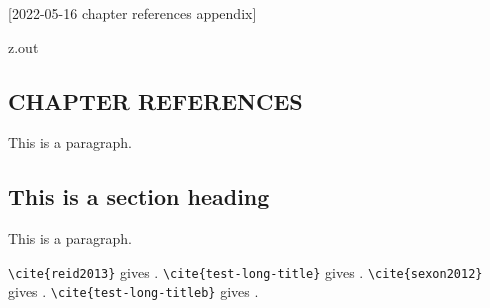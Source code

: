 [2022-05-16 chapter references appendix]

\begin{VerbatimOut}{z.out}
\begin{refsection}
\chapter{CHAPTER REFERENCES}

This is a paragraph.

\section{This is a section heading}

This is a paragraph.

\verb+\cite{reid2013}+ gives \cite{reid2013}.
\verb+\cite{test-long-title}+ gives \cite{test-long-title}.
\verb+\cite{sexon2012}+ gives \cite{sexon2012}.
\verb+\cite{test-long-titleb}+ gives \cite{test-long-titleb}.

\PrintChapterBibliography
\end{refsection}
\end{VerbatimOut}

\MyIO
